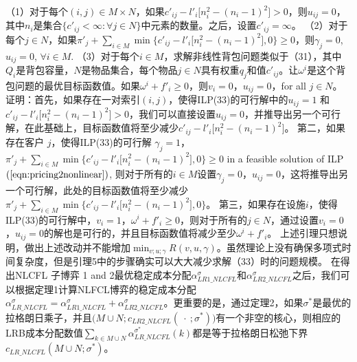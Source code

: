 \documentclass[UTF8]{article}
\begin{document}
\begin{定义}
      （1）对于每个$(i,j)\in M\times N$，如果$c'_{ij} - l'_i\big[n_i^2 - (n_i-1)^2\big] > 0$，则$u_{ij}=0$，其中$n_i$是集合$\{c'_{ij} < \infty: \forall j \in N\}$中元素的数量。之后，设置$c'_{ij}=\infty$。
      （2）对于每个$j\in N$，如果$\pi'_j+\sum_{i\in M}\min\{c'_{ij}- l'_i\big[n_i^2 - (n_i-1)^2\big],0\} \geq 0$，则$\gamma_j=0$, $ u_{ij}=0$,  $\forall i\in M$.
      （3）对于每个$i\in M$，求解非线性背包问题类似于（31），其中$Q_i$是背包容量，$N$是物品集合，每个物品$j\in N$具有权重$q_j$和值$c'_{ij}$。让$\omega^i$是这个背包问题的最优目标函数值。如果$\omega^{i} + f'_{i} \geq 0$，则$v_i=0$，$u_{ij}=0$，for all $j\in N$。
      证明：首先，如果存在一对索引$(i,j)$，使得ILP(33)的可行解中的$u_{ij} = 1$ 和 $c'_{ij} - l'_i\big[n_i^2 - (n_i-1)^2\big] > 0$，我们可以直接设置$u_{ij} = 0$，并推导出另一个可行解，在此基础上，目标函数值将至少减少$c'_{ij} - l'_i\big[n_i^2 - (n_i-1)^2\big]$。
      第二，如果存在客户 $j$，使得ILP(33)的可行解 $\gamma_j = 1$，$\pi'_j+\sum_{i\in M}\min\{c'_{ij}- l'_i\big[n_i^2 - (n_i-1)^2\big],0\} \geq 0$ in a feasible solution of ILP $(\ref{eqn:pricing2nonlinear})$, 则对于所有的$i \in M$设置$\gamma_j = 0$，$u_{ij} = 0$，这将推导出另一个可行解，此处的目标函数值将至少减少$\pi'_j+\sum_{i\in M}\min\{c'_{ij}- l'_i\big[n_i^2 - (n_i-1)^2\big],0\}$。
      第三，如果存在设施$i$，使得ILP(33)的可行解中，$v_i = 1$，$\omega^{i} + f'_{i} \geq 0$，则对于所有的$j \in N$，通过设置$v_i = 0$，$u_{ij} = 0$的解也是可行的，并且目标函数值将减少至少$\omega^{i} + f'_{i}$。
      上述引理只想说明，做出上述改动并不能增加$\min_{v;u;\gamma} R(v,u,\gamma)$。虽然理论上没有确保多项式时间复杂度，但是引理5中的步骤确实可以大大减少求解（33）时的问题规模。
      在得出NLCFL 子博弈 1 and 2最优稳定成本分配$\alpha_{LR1\_NLCFL}^{\sigma}$和$\alpha_{LR2\_NLCFL}^{\sigma}$之后，我们可以根据定理1计算NLFCL博弈的稳定成本分配$\alpha_{LR\_NLCFL}^{\sigma} = \alpha_{LR1\_NLCFL}^{\sigma} + \alpha_{LR2\_NLCFL}^{\sigma}$。更重要的是，通过定理2，如果$\sigma^*$是最优的拉格朗日乘子，并且$\big(M \cup N;c_{LR2\_NLCFL}(\ \cdot\ ;\sigma^*)\big)$有一个非空的核心，则相应的LRB成本分配数值$\sum_{k \in M\cup N}\alpha^{\sigma^*}_{LR\_NLCFL}(k)$都是等于拉格朗日松弛下界$c_{LR\_NLCFL}(M \cup N;\sigma^*)$。


\end{定义}
\end{document}
